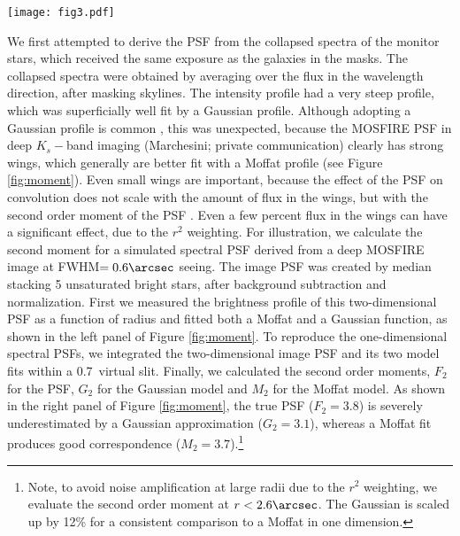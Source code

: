 \documentclass{emulateapj}
\begin{document}
\begin{figure*}
\begin{center}
\texttt{[image: fig3.pdf]}
\caption{Left: surface brightness profile of the two-dimensional $K_s-$band image PSF (dots) as a function of radius, with the best-fit Moffat (solid red line) and Gaussian (dashed green line). The Gaussian is quite steep, whereas the Moffat gives a better approximation of the flux at large radii. Right: a simulated one-dimensional spectral PSF, obtained from integrating the two-dimensional $K_s-$band PSF and the best-fits in a 0.7\arcsec\ virtual slit. The second order moment of the Moffat is close to that of the actual PSF, but that of the Gaussian is much smaller.} 
\label{fig:moment}
\end{center}
\end{figure*}

We first attempted to derive the PSF from the collapsed spectra of the monitor stars, which received the same exposure as the galaxies in the masks. The collapsed spectra were obtained by averaging over the flux in the wavelength direction, after masking skylines. The intensity profile had a very steep profile, which was {superficially} well fit by a Gaussian profile. Although adopting a Gaussian profile is common \citep[e.g.][]{Kriek15}, this was unexpected, because the MOSFIRE PSF in deep $K_s-$band imaging (Marchesini; private communication) clearly has strong wings, which {generally} are better fit with a Moffat profile (see Figure \ref{fig:moment}). Even small wings are important, because the effect of the PSF on convolution does not scale with the amount of flux in the wings, but with the second order moment of the PSF \citep{Franx89}. Even a few percent flux in the wings can have a significant effect, due to the $r^2$ weighting. For illustration, we calculate the second moment for a simulated spectral PSF derived from a deep MOSFIRE image at FWHM$=0.6\arcsec$ seeing. The image PSF was created by median stacking 5 unsaturated bright stars, after background subtraction and normalization. {First w}e measured the brightness profile of th{is two-dimensional} PSF as a function of radius and fitted {both} a Moffat and a Gaussian function, as shown in the left panel of Figure \ref{fig:moment}. To reproduce the one-dimensional spectral PSFs, we integrated the two-dimensional image PSF and its two model fits within a 0.7\arcsec\ virtual slit. Finally, we calculated the second order moments{, $F_2$ for the PSF, $G_2$ for the Gaussian model and $M_2$ for the Moffat model}. As shown in the right panel of Figure \ref{fig:moment}, the true PSF ($F_2 = 3.8$) is severely underestimated by a Gaussian approximation ($G_2 = 3.1$), whereas a Moffat fit produces good correspondence ($M_2 = 3.7$).\footnote{Note, to avoid noise amplification at large radii due to the $r^2$ weighting, we evaluate the second order moment at $r<2.6\arcsec$. The Gaussian is scaled up by 12\% for a consistent comparison to a Moffat in one dimension.}
\end{document}
